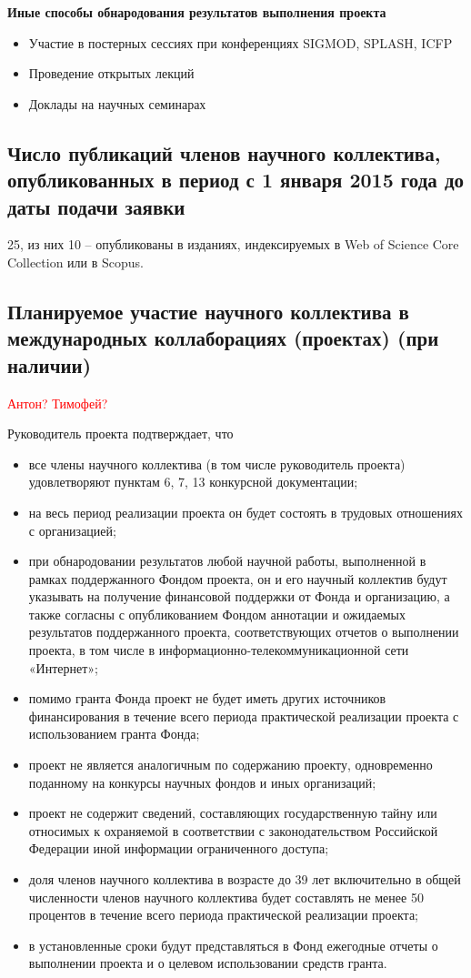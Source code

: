 \documentclass[12pt]{article}  %
\theoremstyle{remark}
\newcommand{\checkme}[1]{\textcolor{red}{#1}}
\begin{document}
\textbf{Иные способы обнародования результатов выполнения проекта}
\begin{itemize}
\item Участие в постерных сессиях при конференциях SIGMOD, SPLASH, ICFP
\item Проведение открытых лекций
\item Доклады на научных семинарах
\end{itemize}

\subsection{Число публикаций членов научного коллектива, опубликованных в период с 1 января 2015 года до даты подачи заявки}

25, из них 10 – опубликованы в изданиях, индексируемых в Web of Science Core Collection или в Scopus.

\subsection{Планируемое участие научного коллектива в международных коллаборациях (проектах) (при наличии)}

\checkme{Антон? Тимофей?}

\vline
Руководитель проекта подтверждает, что
\begin{itemize}
\item все члены научного коллектива (в том числе руководитель проекта) удовлетворяют пунктам 6, 7, 13 конкурсной документации;
\item на весь период реализации проекта он будет состоять в трудовых отношениях с организацией;
\item при обнародовании результатов любой научной работы, выполненной в рамках поддержанного Фондом проекта, он и его научный коллектив будут указывать на получение финансовой поддержки от Фонда и организацию, а также согласны с опубликованием Фондом аннотации и ожидаемых результатов поддержанного проекта, соответствующих отчетов о выполнении проекта, в том числе в информационно-телекоммуникационной сети «Интернет»;
\item помимо гранта Фонда проект не будет иметь других источников финансирования в течение всего периода практической реализации проекта с использованием гранта Фонда;
\item проект не является аналогичным по содержанию проекту, одновременно поданному на конкурсы научных фондов и иных организаций;
\item проект не содержит сведений, составляющих государственную тайну или относимых к охраняемой в соответствии с законодательством Российской Федерации иной информации ограниченного доступа;
\item доля членов научного коллектива в возрасте до 39 лет включительно в общей численности членов научного коллектива будет составлять не менее 50 процентов в течение всего периода практической реализации проекта;
\item в установленные сроки будут представляться в Фонд ежегодные отчеты о выполнении проекта и о целевом использовании средств гранта.
\end{itemize}
\end{document}
